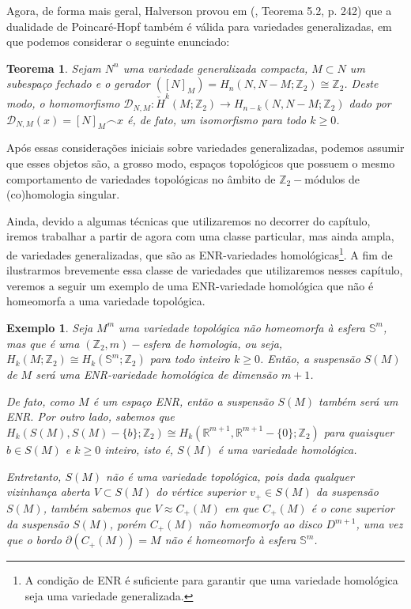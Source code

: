 \documentclass[12pt,oneside]{book} %
\newtheorem{teo}    {\hspace{0.5cm}Teorema}[chapter]
\newtheorem{ex}     {\hspace{0.5cm}Exemplo}[chapter]
\newcommand{\R}{\mathbb{R}}
\newcommand{\Z}{\mathbb{Z}}
\newcommand{\ccap}{\frown}
\begin{document}
\par Agora, de forma mais geral, Halverson provou em (\cite{halverson}, Teorema 5.2, p. 242) que a dualidade de Poincaré-Hopf também é válida para variedades generalizadas, em que podemos considerar o seguinte enunciado:

\begin{teo}
Sejam $N^{n}$ uma variedade generalizada compacta, $M\subset N$ um subespaço fechado e o gerador $([N]_{M})=H_{n}(N,N-M;\Z_{2})\cong\Z_{2}$. Deste modo, o homomorfismo $\mathcal{D}_{N,M}:\check{H}^{k}(M;\Z_{2})\to H_{n-k}(N,N-M;\Z_{2})$ dado por $\mathcal{D}_{N,M}(x)=[N]_{M}\ccap x$ é, de fato, um isomorfismo para todo $k\geq 0$.
\end{teo}

\par Após essas considerações iniciais sobre variedades generalizadas, podemos assumir que esses objetos são, a grosso modo, espaços topológicos que possuem o mesmo comportamento de variedades topológicas no âmbito de $\Z_{2}-$módulos de (co)homologia singular.

\par Ainda, devido a algumas técnicas que utilizaremos no decorrer do capítulo, iremos trabalhar a partir de agora com uma classe particular, mas ainda ampla, de variedades generalizadas, que são as ENR-variedades homológicas\footnote{A condição de ENR é suficiente para garantir que uma variedade homológica seja uma variedade generalizada.}. A fim de ilustrarmos brevemente essa classe de variedades que utilizaremos nesses capítulo, veremos a seguir um exemplo de uma ENR-variedade homológica que não é homeomorfa a uma variedade topológica.

\begin{ex}
Seja $M^{m}$ uma variedade topológica não homeomorfa à esfera $\mathbb{S}^{m}$, mas que é uma $(\Z_{2},m)-$esfera de homologia, ou seja, $H_{k}(M;\Z_{2})\cong H_{k}(\mathbb{S}^{m};\Z_{2})$ para todo inteiro $k\geq 0$. Então, a suspensão $S(M)$ de $M$ será uma ENR-variedade homológica de dimensão $m+1$.

\par De fato, como $M$ é um espaço ENR, então a suspensão $S(M)$ também será um ENR. Por outro lado, sabemos que $H_{k}(S(M),S(M)-\{b\};\Z_{2})\cong H_{k}(\R^{m+1},\R^{m+1}-\{0\};\Z_{2})$  para quaisquer $b\in S(M)$ e $k\geq 0$ inteiro, isto é, $S(M)$ é uma variedade homológica.

\par Entretanto, $S(M)$ não é uma variedade topológica, pois dada qualquer vizinhança aberta $V\subset S(M)$ do vértice superior $v_{+}\in S(M)$ da suspensão $S(M)$, também sabemos que $V\approx C_{+}(M)$ em que $C_{+}(M)$ é o cone superior da suspensão $S(M)$, porém $C_{+}(M)$ não homeomorfo ao disco $D^{m+1}$, uma vez que o bordo $\partial(C_{+}(M))=M$ não é homeomorfo à esfera $\mathbb{S}^{m}$.
\end{ex}
\end{document}
